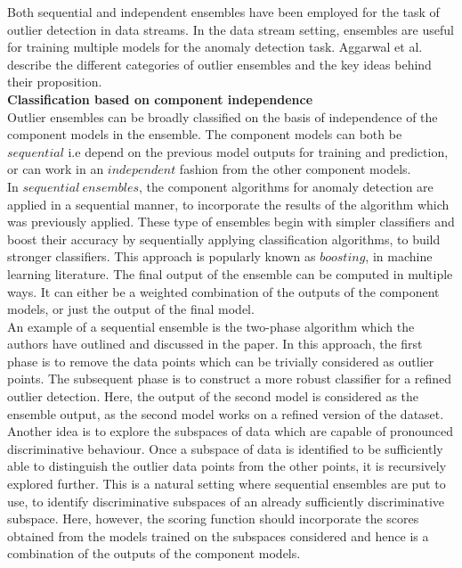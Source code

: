 Both sequential and independent ensembles\cite{RayanaZA16}\cite{aggarwal2013outlier} have been employed for the task of outlier detection in data streams. In the data stream setting, ensembles are useful for training multiple models for the anomaly detection task. Aggarwal et al. describe the different categories of outlier ensembles and the key ideas behind their proposition\cite{aggarwal2013outlier}. \\

\noindent \textbf{Classification based on component independence} \\

Outlier ensembles can be broadly classified on the basis of independence of the component models in the ensemble. The component models can both be $sequential$ i.e depend on the previous model outputs for training and prediction, or can work in an $independent$ fashion from the other component models. \\

In $sequential\ ensembles$, the component algorithms for anomaly detection are applied in a sequential manner, to incorporate the results of the algorithm which was previously applied. These type of ensembles begin with simpler classifiers and boost their accuracy by sequentially applying classification algorithms, to build stronger classifiers. This approach is popularly known as $boosting$, in machine learning literature. The final output of the ensemble can be computed in multiple ways. It can either be a weighted combination of the outputs of the component models, or just the output of the final model. \\

An example of a sequential ensemble is the two-phase algorithm which the authors have outlined and discussed in the paper. In this approach, the first phase is to remove the data points which can be trivially considered as outlier points. The subsequent phase is to construct a more robust classifier for a refined outlier detection. Here, the output of the second model is considered as the ensemble output, as the second model works on a refined version of the dataset. \\

Another idea is to explore the subspaces of data which are capable of pronounced discriminative behaviour. Once a subspace of data is identified to be sufficiently able to distinguish the outlier data points from the other points, it is recursively explored further. This is a natural setting where sequential ensembles are put to use, to identify discriminative subspaces of an already sufficiently discriminative subspace. Here, however, the scoring function should incorporate the scores obtained from the models trained on the subspaces considered and hence is a combination of the outputs of the component models. \\

